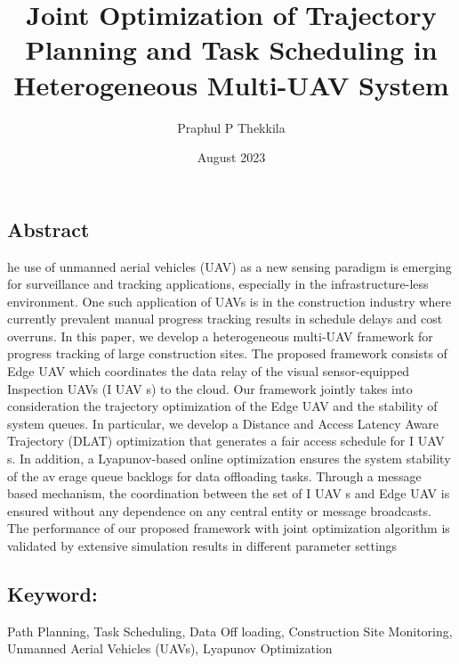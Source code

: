 \documentclass{article}
\title{Joint Optimization of Trajectory Planning and Task Scheduling in
Heterogeneous Multi-UAV System}
\author{Praphul P Thekkila}
\date{August 2023}
\begin{document}
\maketitle
\begin{multicols}{2}
\section*{Abstract}
he use of unmanned aerial vehicles (UAV) as a new sensing paradigm is emerging for surveillance and tracking
applications, especially in the infrastructure-less environment. One such application of UAVs is in the construction industry where currently prevalent manual progress
tracking results in schedule delays and cost overruns. In
this paper, we develop a heterogeneous multi-UAV framework for progress tracking of large construction sites. The
proposed framework consists of Edge UAV which coordinates the data relay of the visual sensor-equipped Inspection UAVs (I UAV s) to the cloud. Our framework jointly
takes into consideration the trajectory optimization of the
Edge UAV and the stability of system queues. In particular, we develop a Distance and Access Latency Aware
Trajectory (DLAT) optimization that generates a fair access schedule for I UAV s. In addition, a Lyapunov-based
online optimization ensures the system stability of the average queue backlogs for data offloading tasks. Through a
message based mechanism, the coordination between the
set of I UAV s and Edge UAV is ensured without any
dependence on any central entity or message broadcasts.
The performance of our proposed framework with joint
optimization algorithm is validated by extensive simulation results in different parameter settings

\subsection*{Keyword:} Path Planning, Task Scheduling, Data Off loading, Construction Site Monitoring, Unmanned Aerial
Vehicles (UAVs), Lyapunov Optimization



\end{multicols}
\end{document}
